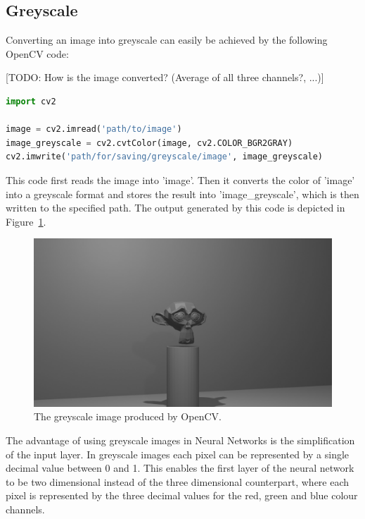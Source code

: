 \subsection{Greyscale}
Converting an image into greyscale can easily be achieved by the following OpenCV code:

[TODO: How is the image converted? (Average of all three channels?, ...)]

\begin{lstlisting}[language=python]
import cv2

image = cv2.imread('path/to/image')
image_greyscale = cv2.cvtColor(image, cv2.COLOR_BGR2GRAY)
cv2.imwrite('path/for/saving/greyscale/image', image_greyscale)
\end{lstlisting}

This code first reads the image into 'image'. Then it converts the color of 'image' into a greyscale format and stores the result into 'image\_greyscale', which is then written to the specified path. The output generated by this code is depicted in Figure~\ref{pic:implementation_opencv_greyscale}.

\begin{figure}[h!]
	\centering
	\includegraphics[width=5in]{img/implementation_opencv_greyscale.png}
	\caption{The greyscale image produced by OpenCV.}
	\label{pic:implementation_opencv_greyscale}
\end{figure}

The advantage of using greyscale images in Neural Networks is the simplification of the input layer. In greyscale images each pixel can be represented by a single decimal value between 0 and 1. This enables the first layer of the neural network to be two dimensional instead of the three dimensional counterpart, where each pixel is represented by the three decimal values for the red, green and blue colour channels.

